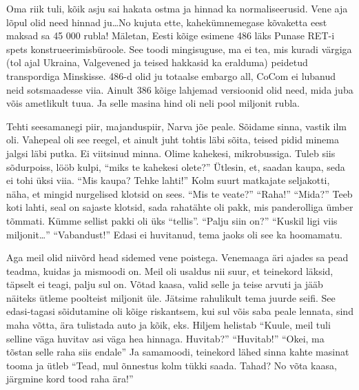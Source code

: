Oma riik tuli, kõik asju sai hakata ostma ja hinnad ka normaliseerusid. Vene aja lõpul olid need hinnad ju\ldots No kujuta ette, kahekümnemegase kõvaketta eest maksad sa 45 000 rubla! Mäletan, Eesti kõige esimene 486 läks Punase RET-i spets konstrueerimisbüroole. See toodi mingisuguse, ma ei tea, mis kuradi värgiga (tol ajal Ukraina, Valgevened ja teised hakkasid ka eralduma)  peidetud transpordiga Minskisse. 486-d olid ju totaalse embargo all, CoCom ei lubanud neid sotsmaadesse viia. Ainult 386 kõige lahjemad versioonid olid need, mida juba võis ametlikult tuua. Ja selle masina hind oli neli pool miljonit rubla.


Tehti seesamanegi piir, majanduspiir, Narva jõe peale. Sõidame sinna, vastik ilm oli. Vahepeal oli see reegel, et ainult juht tohtis läbi sõita, teised pidid minema jalgsi läbi putka. Ei viitsinud minna. Olime kahekesi, mikrobussiga. Tuleb siis sõdurpoiss, lööb kulpi, \enquote{miks te kahekesi olete?} Ütlesin, et, saadan kaupa, seda ei tohi üksi viia. \enquote{Mis kaupa? Tehke lahti!} Kolm suurt matkajate seljakotti, näha, et mingid nurgelised klotsid on sees. \enquote{Mis te veate?} \enquote{Raha!} \enquote{Mida?} Teeb koti lahti, seal on sajaste klotsid, sada rahatähte oli pakk, mis panderolliga ümber tõmmati. Kümme sellist pakki oli üks \enquote{tellis}. \enquote{Palju siin on?} \enquote{Kuskil ligi viis miljonit\ldots} \enquote{Vabandust!} Edasi ei huvitanud, tema jaoks oli see ka hoomamatu. 

Aga meil olid niivõrd head sidemed vene poistega. Venemaaga äri ajades sa pead teadma, kuidas ja mismoodi on. Meil oli usaldus nii suur, et teinekord läksid,  täpselt ei teagi, palju sul on. Võtad kaasa, valid selle ja teise arvuti ja jääb näiteks ütleme poolteist miljonit üle. Jätsime rahulikult tema juurde seifi. See edasi-tagasi sõidutamine oli kõige riskantsem, kui sul võis saba peale lennata, sind maha võtta, ära tulistada auto ja kõik, eks. Hiljem helistab \enquote{Kuule, meil tuli selline väga huvitav asi väga hea hinnaga. Huvitab?} \enquote{Huvitab!} \enquote{Okei, ma tõstan selle raha siis endale} Ja samamoodi, teinekord lähed sinna kahte masinat tooma ja ütleb \enquote{Tead, mul õnnestus kolm tükki saada. Tahad? No võta kaasa, järgmine kord tood raha ära!} 

